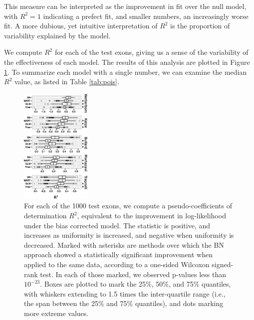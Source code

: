 \documentclass{bioinfo}
\begin{document}
This measure can be interpreted as the improvement in fit over the null model,
with $R^2 = 1$ indicating a prefect fit, and smaller numbers, an increasingly
worse fit. A more dubious, yet intuitive interpretation of $R^2$ is the
proportion of variability explained by the model.

We compute $R^2$ for each of the test exons, giving us a sense of the variability
of the effectiveness of each model. The results of this analysis are plotted in
Figure \ref{fig:pois}.  To summarize each model with a single number, we can
examine the median $R^2$ value, as listed in Table \ref{tab:pois}.

\begin{figure}
\centerline{\includegraphics[width=0.30\textwidth]{pois-boxplot.eps}}
\caption{For each of the 1000 test exons, we compute a pseudo-coefficients of
determination $R^2$, equivalent to the improvement in log-likelihood under the
bias corrected model. The statistic is positive, and increases as uniformity is
increased, and negative when uniformity is decreased.  Marked with asterisks are
methods over which the BN approach showed a statistically significant improvement
when applied to the same data, according to a one-sided Wilcoxon signed-rank
test. In each of those marked, we observed p-values less than $10^{-23}$.  Boxes
are plotted to mark the 25\%, 50\%, and 75\% quantiles, with whiskers extending
to 1.5 times the inter-quartile range (i.e., the span between the 25\% and 75\%
quantiles), and dots marking more extreme values.
}


    \label{fig:pois}
\end{figure}
\end{document}
